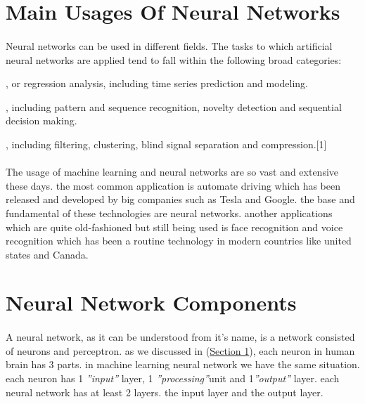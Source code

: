 \documentclass[12pt , a4paper]{article}
\begin{document}
\newpage



\section{Main Usages Of Neural Networks } 
\paragraph{} Neural networks can be used in different fields. The tasks to which artificial neural networks are applied tend to fall within the following broad categories: \\
\begin{description}[font=$\bullet$~\normalfont\scshape\color{red!50!black}]
\item [ Function approximation], or regression analysis, including time series prediction and modeling.
\item [Classification], including pattern and sequence recognition, novelty detection and sequential decision making.
\item [Data processing], including filtering, clustering, blind signal separation and compression.[1]

\end{description}
\paragraph{} The usage of machine learning and neural networks are so vast and extensive these days. the most common application is automate driving which has been released and developed by big companies such as Tesla and Google. the base and fundamental of these technologies are neural networks. another applications which are quite old-fashioned but still being used is face recognition and voice recognition which has been a routine technology in modern countries like united states and Canada. \\

\section{ Neural Network Components }
\paragraph{} A neural network, as it can be understood from it’s name, is a network consisted of neurons and perceptron. as we discussed in  (\hyperref [sec:1]{Section 1}), each neuron in human brain has 3 parts. in machine learning neural network we have the same situation. each neuron has 1 \textit{''input''} layer, 1 \textit{''processing''}unit and 1\textit{''output''} layer. each neural network has at least 2 layers. the input layer and the output layer. 
\end{document}
